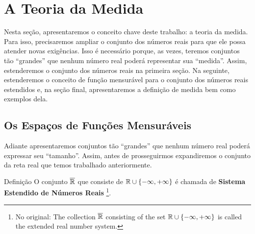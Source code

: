 \chapter{A Teoria da Medida}
    Nesta seção, apresentaremos o conceito chave deste trabalho: a teoria da medida.
    Para isso, precisaremos ampliar o conjunto dos números reais para que ele possa atender novas exigências.
    Isso é necessário porque, as vezes, teremos conjuntos tão \enquote{grandes} que nenhum número real poderá representar sua \enquote{medida}. 
    Assim, estenderemos o conjunto dos números reais na primeira seção.
    Na seguinte, estenderemos o conceito de função mensurável para o conjunto dos números reais estendidos e, na seção final, apresentaremos a definição de medida bem como exemplos dela.
    
\section{Os Espaços de Funções Mensuráveis}
	Adiante apresentaremos conjuntos tão \enquote{grandes} que nenhum número real poderá expressar seu \enquote{tamanho}.
	Assim, antes de prosseguirmos expandiremos o conjunto da reta real que temos trabalhado anteriormente.
    \begin{env}{Definição}
    \label{def:reta-estendida}
        O conjunto $\operatorname{\overline{\mathbb{R}}}$ que consiste de $\mathbb{R} \cup \{-\infty, +\infty\}$ é chamada de \textbf{Sistema Estendido de Números Reais}
        \cite[p.5, tradução nossa]{bartle}
        \footnote{No original: The collection $\operatorname{\overline{\mathbb{R}}}$ consisting of
        	the set $\mathbb{R} \cup \{ -\infty , + \infty\}$ is called the extended real number system.}.
    \end{env}

